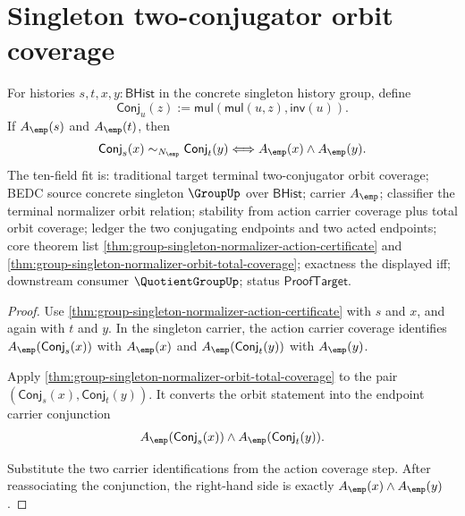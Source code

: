 \section{Singleton two-conjugator orbit coverage}
\label{sec:group-singleton-two-conjugator-orbit-coverage}

\begin{theorem}
\label{thm:group-singleton-two-conjugator-orbit-coverage}
For histories $s,t,x,y:\mathsf{BHist}$ in the concrete singleton history group,
define
$$
\mathsf{Conj}_u(z):=\mathsf{mul}(\mathsf{mul}(u,z),\mathsf{inv}(u)).
$$
If $A_{\emp}(s)$ and $A_{\emp}(t)$, then
$$
\mathsf{Conj}_s(x)\sim_{N_{\emp}}\mathsf{Conj}_t(y)
\Longleftrightarrow A_{\emp}(x)\land A_{\emp}(y).
$$
The ten-field fit is: traditional target terminal two-conjugator orbit
coverage; BEDC source concrete singleton $\GroupUp$ over $\mathsf{BHist}$;
carrier $A_{\emp}$; classifier the terminal normalizer orbit relation;
stability from action carrier coverage plus total orbit coverage; ledger the
two conjugating endpoints and two acted endpoints; core theorem list
\autoref{thm:group-singleton-normalizer-action-certificate} and
\autoref{thm:group-singleton-normalizer-orbit-total-coverage}; exactness the
displayed iff; downstream consumer $\QuotientGroupUp$; status
$\mathsf{ProofTarget}$.
\end{theorem}
\begin{proof}
Use \autoref{thm:group-singleton-normalizer-action-certificate} with $s$ and
$x$, and again with $t$ and $y$. In the singleton carrier, the action carrier
coverage identifies $A_{\emp}(\mathsf{Conj}_s(x))$ with $A_{\emp}(x)$ and
$A_{\emp}(\mathsf{Conj}_t(y))$ with $A_{\emp}(y)$.

Apply \autoref{thm:group-singleton-normalizer-orbit-total-coverage} to the pair
$(\mathsf{Conj}_s(x),\mathsf{Conj}_t(y))$. It converts the orbit statement into
the endpoint carrier conjunction
$$
A_{\emp}(\mathsf{Conj}_s(x))\land
A_{\emp}(\mathsf{Conj}_t(y)).
$$

Substitute the two carrier identifications from the action coverage step. After
reassociating the conjunction, the right-hand side is exactly
$A_{\emp}(x)\land A_{\emp}(y)$.
\end{proof}
